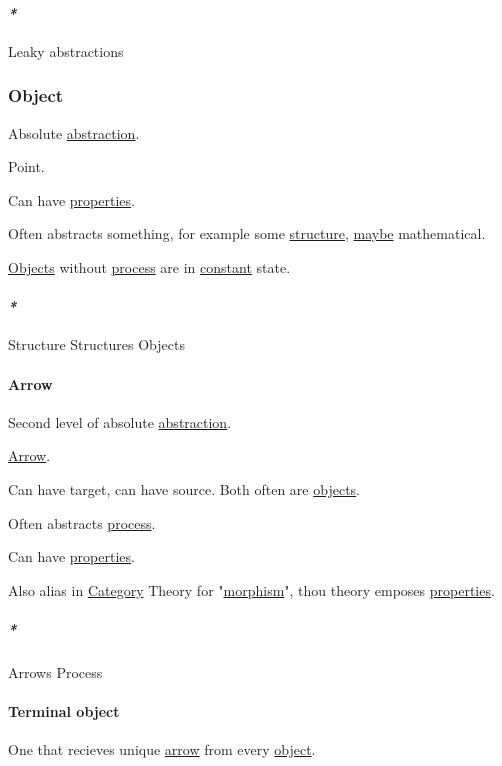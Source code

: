 \documentclass[a4paper,14pt,oneside]{book}
\begin{document}
\paragraph{\emph{*}}
\label{sec:orgb469d0a}

\label{org6699a87}Leaky abstractions

\subsubsection{\label{org8d6cd26}Object}
\label{sec:org7ee19b2}
Absolute \hyperref[org550217a]{abstraction}.

Point.

Can have \hyperref[orgaebb0b7]{properties}.

Often abstracts something, for example some \hyperref[org105c77d]{structure}, \hyperref[org7b4a827]{maybe} mathematical.

\hyperref[org88e24d2]{Objects} without \hyperref[org8b072db]{process} are in \hyperref[org5f03168]{constant} state.

\paragraph{\emph{*}}
\label{sec:org80263e1}

\label{org105c77d}Structure
\label{orgbfc87b3}Structures
\label{org88e24d2}Objects

\paragraph{\label{org7824ca6}Arrow}
\label{sec:orga710dc0}
Second level of absolute \hyperref[org550217a]{abstraction}.

\hyperref[org0b51b24]{Arrow}.

Can have target, can have source. Both often are \hyperref[org88e24d2]{objects}.

Often abstracts \hyperref[org8b072db]{process}.

Can have \hyperref[orgaebb0b7]{properties}.

Also alias in \hyperref[org82baa03]{Category} Theory for "\hyperref[orgcfa41a6]{morphism}", thou theory emposes \hyperref[orgaebb0b7]{properties}.

\subparagraph{\emph{*}}
\label{sec:org4175b44}
\label{org51c45d5}Arrows
\label{org8b072db}Process

\paragraph{\label{orgbc0b3c7}Terminal object}
\label{sec:org17a3953}
One that recieves unique \hyperref[org0b51b24]{arrow} from every \hyperref[org8d6cd26]{object}.
\end{document}

